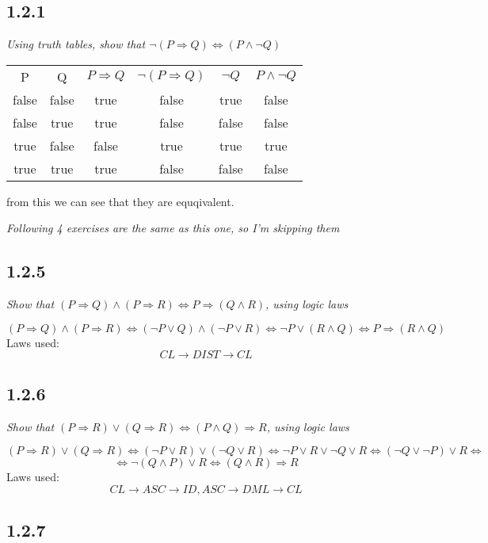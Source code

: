 \documentclass[11pt,oneside,titlepage]{book}
\DeclareMathOperator \lra {\Leftrightarrow}
\DeclareMathOperator \eqv {\Leftrightarrow}
\DeclareMathOperator \ra {\Rightarrow}
\DeclareMathOperator \imp {\Rightarrow}
\begin{document}
\subsection*{1.2.1}

\textit{Using truth tables, show that $\neg(P \ra Q) \lra (P \land \neg Q)$}

\begin{center}
  \begin{tabular}{c| c| c| c| c| c|}
    P & Q & $P \ra Q$ & $\neg(P \ra Q)$ & $\neg Q$ & $P \land \neg Q$ \\
    false & false & true & false & true & false \\
    false & true & true & false & false & false \\
    true & false & false & true & true & true \\
    true & true & true & false & false & false \\
  \end{tabular}  
\end{center}

from this we can see that they are equqivalent.

\textit{Following 4 exercises are the same as this one, so I'm skipping them}

\subsection*{1.2.5}

\textit{Show that $(P \imp Q) \land (P \imp R) \eqv P \imp (Q \land R)$, using logic laws}

$$(P \imp Q) \land (P \imp R) \eqv (\neg P \lor Q) \land (\neg P \lor R) \eqv
\neg P  \lor (R \land Q) \eqv  P  \imp (R \land Q) $$
Laws used: 
$$CL \to DIST \to CL$$

\subsection*{1.2.6}

\textit{Show that $(P \imp R) \lor (Q \imp R) \eqv (P \land Q) \imp R$, using logic laws}

$$(P \imp R) \lor (Q \imp R)  \eqv (\neg P \lor R) \lor (\neg Q \lor R) \eqv
\neg P \lor R \lor \neg Q \lor R \eqv (\neg Q \lor \neg P) \lor R \eqv$$
$$ \eqv \neg (Q \land P) \lor R
\eqv (Q \land R) \imp R$$
Laws used:
$$CL \to ASC \to ID, ASC \to DML \to CL$$

\subsection*{1.2.7}
\end{document}
